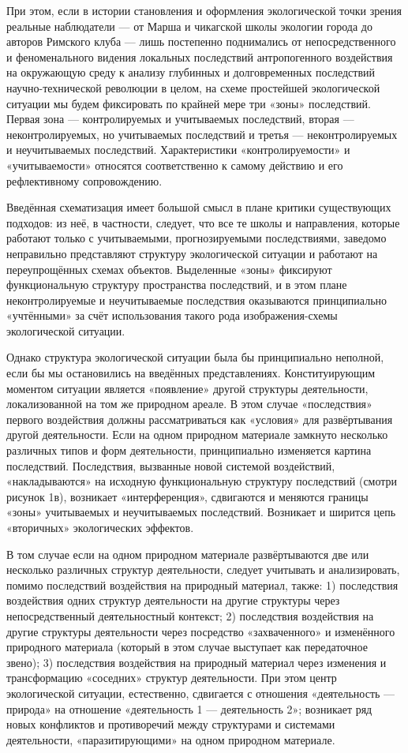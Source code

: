 \documentclass[11pt,a4paper]{article}
\begin{document}
При этом, если в истории становления и оформления экологической точки зрения
реальные наблюдатели — от Марша и чикагской школы экологии города до авторов
Римского клуба — лишь постепенно поднимались от непосредственного и
феноменального видения локальных последствий антропогенного воздействия на
окружающую среду к анализу глубинных и долговременных последствий
научно-технической революции в целом, на схеме простейшей экологической
ситуации мы будем фиксировать по крайней мере три «зоны» последствий. Первая
зона — контролируемых и учитываемых последствий, вторая — неконтролируемых, но
учитываемых последствий и третья — неконтролируемых и неучитываемых
последствий.  Характеристики «контролируемости» и «учитываемости» относятся
соответственно к самому действию и его рефлективному сопровождению.

Введённая схематизация имеет большой смысл в плане критики существующих
подходов: из неё, в частности, следует, что все те школы и направления,
которые работают только с учитываемыми, прогнозируемыми последствиями,
заведомо неправильно представляют структуру экологической ситуации и работают
на переупрощённых схемах объектов. Выделенные «зоны» фиксируют функциональную
структуру пространства последствий, и в этом плане неконтролируемые и
неучитываемые последствия оказываются принципиально «учтёнными» за счёт
использования такого рода изображения-схемы экологической ситуации. 

Однако структура экологической ситуации была бы принципиально неполной, если
бы мы остановились на введённых представлениях. Конституирующим моментом
ситуации является «появление» другой структуры деятельности, локализованной на
том же природном ареале. В этом случае «последствия» первого воздействия
должны рассматриваться как «условия» для развёртывания другой
деятельности. Если на одном природном материале замкнуто несколько различных
типов и форм деятельности, принципиально изменяется картина
последствий. Последствия, вызванные новой системой воздействий,
«накладываются» на исходную функциональную структуру последствий (смотри
рисунок 1в), возникает «интерференция», сдвигаются и меняются границы «зоны»
учитываемых и неучитываемых последствий. Возникает и ширится цепь «вторичных»
экологических эффектов. 

В том случае если на одном природном материале развёртываются две или
несколько различных структур деятельности, следует учитывать и анализировать,
помимо последствий воздействия на природный материал, также: 1) последствия
воздействия одних структур деятельности на другие структуры через
непосредственный деятельностный контекст; 2) последствия воздействия на другие
структуры деятельности через посредство «захваченного» и изменённого
природного материала (который в этом случае выступает как передаточное звено);
3) последствия воздействия на природный материал через изменения и
трансформацию «соседних» структур деятельности. При этом центр экологической
ситуации, естественно, сдвигается с отношения «деятельность — природа» на
отношение «деятельность 1 — деятельность 2»; возникает ряд новых конфликтов и
противоречий между структурами и системами деятельности, «паразитирующими» на
одном природном материале. 
\end{document}
